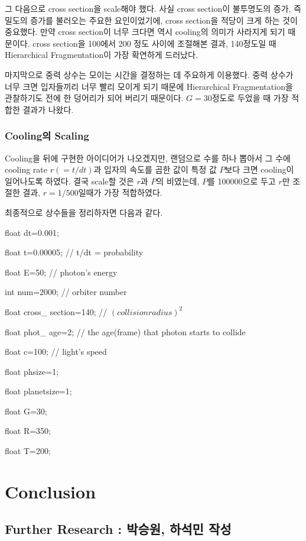 \documentclass{gshs-hutech}
\begin{document}
그 다음으로 cross section을 scale해야 했다. 사실 cross section이 불투명도의 증가, 즉 밀도의 증가를 불러오는 주요한 요인이었기에, cross section을 적당이 크게 하는 것이 중요했다. 만약 cross section이 너무 크다면 역시 cooling의 의미가 사라지게 되기 때문이다. cross section을 100에서 200 정도 사이에 조절해본 결과, 140정도일 때 Hierarchical Fragmentation이 가장 확연하게 드러났다. 

마지막으로 중력 상수는 모이는 시간을 결정하는 데 주요하게 이용했다. 중력 상수가 너무 크면 입자들끼리 너무 빨리 모이게 되기 때문에 Hierarchical Fragmentation을 관찰하기도 전에 한 덩어리가 되어 버리기 때문이다. $G=30$정도로 두었을 때 가장 적합한 결과가 나왔다. 


\subsection{Cooling의 Scaling}

Cooling을 뒤에 구현한 아이디어가 나오겠지만, 랜덤으로 수를 하나 뽑아서 그 수에 cooling rate $r(=t/dt)$과 입자의 속도를 곱한 값이 특정 값 $P$보다 크면 cooling이 일어나도록 하였다. 결국 scale할 것은 $r$과 $P$의 비였는데, $P$를 100000으로 두고 $r$만 조절한 결과, $r=1/500$일때가 가장 적합하였다.

최종적으로 상수들을 정리하자면 다음과 같다.


float dt=0.001;

float t=0.00005;  //  t/dt = probability

float E=50;    // photon's energy

int num=2000;   // orbiter number

float cross\_ section=140;  //  $(collision radius)^2$

float phot\_ age=2;  // the age(frame) that photon starts to collide

float c=100; //  light's speed

float phsize=1;

float planetsize=1;

float G=30;

float R=350;

float T=200;


\chapter{Conclusion} \label{conclusion}

\section{Further Research : 박승원, 하석민 작성} \label{further}
\end{document}
